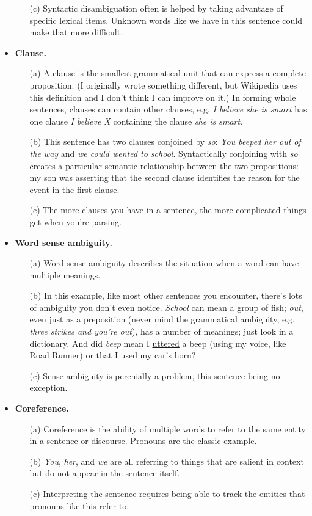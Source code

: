 \documentclass[11pt]{article}
\begin{document}
\begin{itemize}
\begin{itemize}
\item[(c)] Syntactic disambiguation often is helped by taking advantage of specific lexical items.  Unknown words like we have in this sentence could make that more difficult.
\end{itemize}
\item {\bf Clause.}
\begin{itemize}
\item[(a)] A clause is the smallest grammatical unit that can express a complete proposition.  (I originally wrote something different, but Wikipedia uses this definition and I don't think I can improve on it.)  In forming whole sentences, clauses can contain other clauses, e.g. \emph{I believe she is smart} has one clause \emph{I believe X} containing the clause \emph{she is smart}.
\item[(b)] This sentence has two clauses conjoined by \emph{so}: \emph{You beeped her out of the way} and \emph{we could wented to school}.  Syntactically conjoining with \emph{so} creates a particular semantic relationship between the two propositions: my son was asserting that the second clause identifies the reason for the event in the first clause.
\item[(c)]  The more clauses you have in a sentence, the more complicated things get when you're parsing.
\end{itemize}
\item {\bf Word sense ambiguity.}  
\begin{itemize}
\item[(a)] Word sense ambiguity describes the situation when a word can have multiple meanings.
\item[(b)] In this example, like most other sentences you encounter, there's lots of ambiguity you don't even notice.  \emph{School} can mean a group of fish; \emph{out}, even just as a preposition (never mind the grammatical ambiguity, e.g. \emph{three strikes and you're out}), has a number of meanings; just look in a dictionary.  And did \emph{beep} mean I \underline{uttered} a beep (using my voice, like Road Runner) or that I used my car's horn?
\item[(c)] Sense ambiguity is perenially a problem, this sentence being no exception.
\end{itemize}
\item {\bf Coreference.}
\begin{itemize}
\item[(a)] Coreference is the ability of multiple words to refer to the same entity in a sentence or discourse.  Pronouns are the classic example.
\item[(b)] \emph{You}, \emph{her}, and \emph{we} are all referring to things that are salient in context but do not appear in the sentence itself.
\item[(c)] Interpreting the sentence requires being able to track the entities that pronouns like this refer to.
\end{itemize}
\end{itemize}
\end{document}
